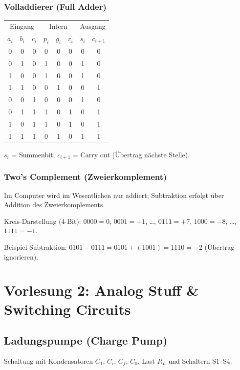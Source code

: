 \documentclass[11pt,a4paper]{article}
\begin{document}
\subsubsection{Volladdierer (Full Adder)}
\begin{center}
\begin{tabular}{ccc|ccc|cc}
    \toprule
    \multicolumn{3}{c|}{Eingang} & \multicolumn{3}{c|}{Intern} & \multicolumn{2}{c}{Ausgang} \\
    $a_i$ & $b_i$ & $c_i$ & $p_i$ & $g_i$ & $r_i$ & $s_i$ & $c_{i+1}$ \\ \midrule
    0&0&0&0&0&0&0&0\\
    0&1&0&1&0&0&1&0\\
    1&0&0&1&0&0&1&0\\
    1&1&0&0&1&0&0&1\\
    0&0&1&0&0&0&1&0\\
    0&1&1&1&0&1&0&1\\
    1&0&1&1&0&1&0&1\\
    1&1&1&0&1&0&1&1\\ \bottomrule
\end{tabular}
\end{center}
$s_i$ = Summenbit, $c_{i+1}$ = Carry out (Übertrag nächste Stelle).

\subsubsection{Two's Complement (Zweierkomplement)}
Im Computer wird im Wesentlichen nur addiert; Subtraktion erfolgt über Addition des Zweierkomplements.

Kreis-Darstellung (4-Bit): $0000 = 0$, $0001 = +1$, \ldots, $0111 = +7$, $1000 = -8$, \ldots, $1111 = -1$.

Beispiel Subtraktion: $0101 - 0111 = 0101 + (1001) = 1110 = -2$ (Übertrag ignorieren).

\newpage
\section{Vorlesung 2: Analog Stuff \& Switching Circuits}

\subsection{Ladungspumpe (Charge Pump)}
Schaltung mit Kondensatoren $C_1$, $C_i$, $C_f$, $C_0$, Last $R_L$ und Schaltern S1--S4.
\end{document}
